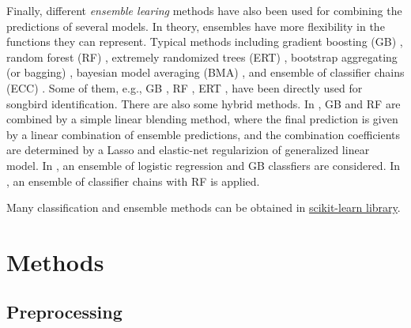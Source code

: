 \documentclass[12pt,peerreview,letterpaper]{IEEEtran}
\begin{document}
Finally, different {\em ensemble learing} methods have also been used for combining the predictions of several models. In theory, ensembles have more flexibility in the functions they can represent. Typical methods including gradient boosting (GB) \cite{friedman2001greedy}, random forest (RF) \cite{breiman2001random}, extremely randomized trees (ERT) \cite{geurts2006extremely}, bootstrap aggregating (or bagging) \cite{breiman1996bagging}, bayesian model averaging (BMA) \cite{hoeting1999bayesian}, and ensemble of classifier chains (ECC) \cite{read2011classifier}. Some of them, e.g., GB \cite{chennovel13}, RF \cite{Stowell_NIPSW13,chennovel13,fodor2013ninth},
ERT \cite{Lasseck13}, have been directly used for songbird identification. There are also some hybrid methods. In \cite{chennovel13}, GB and RF are combined by a simple linear blending method, where the final prediction is given by a linear combination of ensemble predictions, and the combination coefficients are determined by a Lasso and elastic-net regularizion of generalized linear model. In \cite{Massaron13}, an ensemble of logistic regression and GB classfiers are considered. In \cite{mlsp2}, an ensemble of classifier chains with RF is applied.

Many classification and ensemble methods can be obtained in \href{http://scikit-learn.org}{scikit-learn library}.

\section{Methods}

\subsection{Preprocessing}
\end{document}

